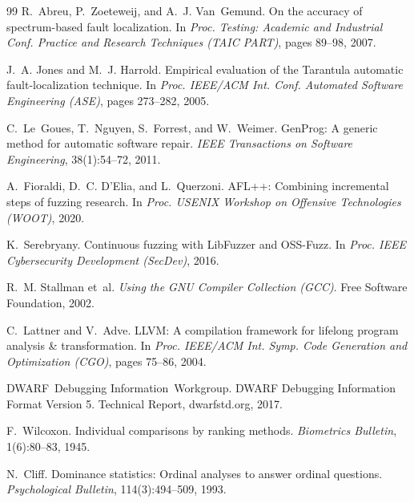 \documentclass[sigconf,review,anonymous=false]{acmart}
\theoremstyle{definition}
\begin{document}
\begin{thebibliography}{99}
R.~Abreu, P.~Zoeteweij, and A.~J. Van~Gemund.
\newblock On the accuracy of spectrum-based fault localization.
\newblock In \emph{Proc. Testing: Academic and Industrial Conf. Practice and Research Techniques (TAIC PART)}, pages 89--98, 2007.

J.~A. Jones and M.~J. Harrold.
\newblock Empirical evaluation of the Tarantula automatic fault-localization technique.
\newblock In \emph{Proc. IEEE/ACM Int. Conf. Automated Software Engineering (ASE)}, pages 273--282, 2005.

C.~Le~Goues, T.~Nguyen, S.~Forrest, and W.~Weimer.
\newblock GenProg: A generic method for automatic software repair.
\newblock \emph{IEEE Transactions on Software Engineering}, 38(1):54--72, 2011.

A.~Fioraldi, D.~C. D'Elia, and L.~Querzoni.
\newblock AFL++: Combining incremental steps of fuzzing research.
\newblock In \emph{Proc. USENIX Workshop on Offensive Technologies (WOOT)}, 2020.

K.~Serebryany.
\newblock Continuous fuzzing with LibFuzzer and OSS-Fuzz.
\newblock In \emph{Proc. IEEE Cybersecurity Development (SecDev)}, 2016.

R.~M. Stallman et~al.
\newblock \emph{Using the GNU Compiler Collection (GCC)}.
\newblock Free Software Foundation, 2002.

C.~Lattner and V.~Adve.
\newblock LLVM: A compilation framework for lifelong program analysis \& transformation.
\newblock In \emph{Proc. IEEE/ACM Int. Symp. Code Generation and Optimization (CGO)}, pages 75--86, 2004.

DWARF~Debugging Information~Workgroup.
\newblock DWARF Debugging Information Format Version 5.
\newblock Technical Report, dwarfstd.org, 2017.

F.~Wilcoxon.
\newblock Individual comparisons by ranking methods.
\newblock \emph{Biometrics Bulletin}, 1(6):80--83, 1945.

N.~Cliff.
\newblock Dominance statistics: Ordinal analyses to answer ordinal questions.
\newblock \emph{Psychological Bulletin}, 114(3):494--509, 1993.

\end{thebibliography}
\end{document}
